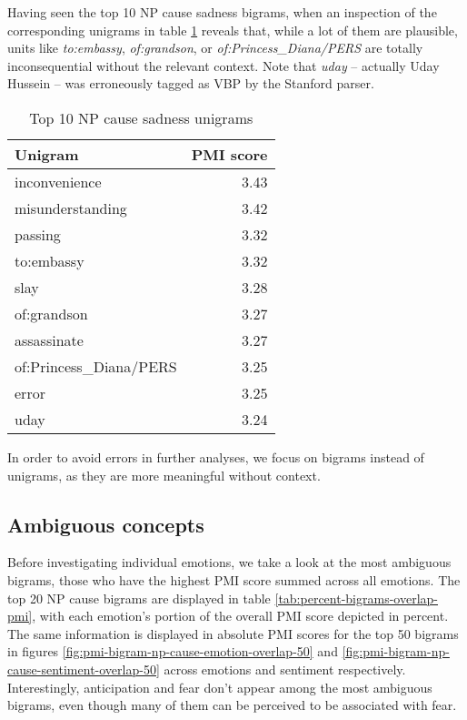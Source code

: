 Having seen the top 10 NP cause sadness bigrams, when an inspection of the corresponding unigrams in table \ref{tab:sadness-unigrams} reveals that, while a lot of them are plausible, units like \textit{to:embassy}, \textit{of:grandson}, or \textit{of:Princess\_Diana/PERS} are totally inconsequential without the relevant context. Note that \textit{uday} -- actually Uday Hussein -- was erroneously tagged as \textsc{VBP} by the Stanford parser.

\begin{table}[h]
\centering
\begin{tabular}{l|r}
{\bf Unigram}  & {\bf PMI score} \\\hline
inconvenience  & 3.43            \\
misunderstanding  & 3.42            \\
passing  & 3.32            \\
to:embassy  & 3.32            \\
slay & 3.28            \\
of:grandson & 3.27            \\
assassinate & 3.27            \\
of:Princess\_Diana/PERS & 3.25            \\
error & 3.25            \\
uday & 3.24              
\end{tabular}
\caption{Top 10 NP cause sadness unigrams}
\label{tab:sadness-unigrams}
\end{table}

In order to avoid errors in further analyses, we focus on bigrams instead of unigrams, as they are more meaningful without context.

\subsection{Ambiguous concepts}

Before investigating individual emotions, we take a look at the most ambiguous bigrams, those who have the highest PMI score summed across all emotions. The top 20 NP cause bigrams are displayed in table \ref{tab:percent-bigrams-overlap-pmi}, with each emotion's portion of the overall PMI score depicted in percent. The same information is displayed in absolute PMI scores for the top 50 bigrams in figures \ref{fig:pmi-bigram-np-cause-emotion-overlap-50} and \ref{fig:pmi-bigram-np-cause-sentiment-overlap-50} across emotions and sentiment respectively. 
Interestingly, anticipation and fear don't appear among the most ambiguous bigrams, even though many of them can be perceived to be associated with fear.

